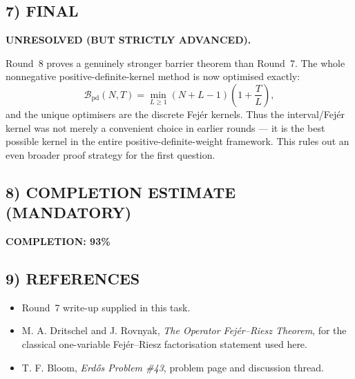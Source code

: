 \subsection{7) FINAL}

\textbf{UNRESOLVED (BUT STRICTLY ADVANCED).}

Round~8 proves a genuinely stronger barrier theorem than Round~7.  The whole nonnegative positive-definite-kernel method is now optimised exactly:
\[
\mathcal B_{\mathrm{pd}}(N,T)=\min_{L\ge 1}(N+L-1)\left(1+\frac{T}{L}\right),
\]
and the unique optimisers are the discrete Fej\'er kernels.  Thus the interval/Fej\'er kernel was not merely a convenient choice in earlier rounds --- it is the best possible kernel in the entire positive-definite-weight framework.  This rules out an even broader proof strategy for the first question.

\subsection{8) COMPLETION ESTIMATE (MANDATORY)}

\textbf{COMPLETION: 93\%}

\subsection{9) REFERENCES}

\begin{itemize}
\item Round~7 write-up supplied in this task.
\item M. A. Dritschel and J. Rovnyak, \emph{The Operator Fej\'er--Riesz Theorem}, for the classical one-variable Fej\'er--Riesz factorisation statement used here.
\item T. F. Bloom, \emph{Erd\H{o}s Problem \#43}, problem page and discussion thread.
\end{itemize}
